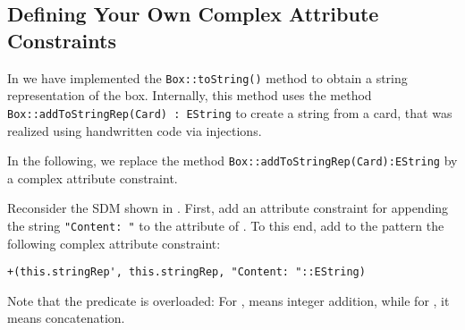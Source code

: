 \subsection{Defining Your Own Complex Attribute Constraints}  
In  we have implemented the \texttt{Box::toString()} method to obtain a string representation of the box. 
Internally, this method uses the method \texttt{Box::addToStringRep(Card) : EString} to create a string from a card, that was realized using handwritten code via injections.

In the following, we replace the method \texttt{Box::addToStringRep(Card):EString} by a complex attribute constraint.

\begin{stepbystep}
\item 
Reconsider the SDM shown in .
First, add an attribute constraint for appending the string \texttt{"Content: "} to the  attribute of .
To this end, add to the  pattern the following complex attribute constraint:
\begin{verbatim}
+(this.stringRep', this.stringRep, "Content: "::EString)
\end{verbatim}
\end{stepbystep}  
Note that the predicate \entity{+} is overloaded: For , \entity{+} means integer addition, while for , it means concatenation.
   	  


